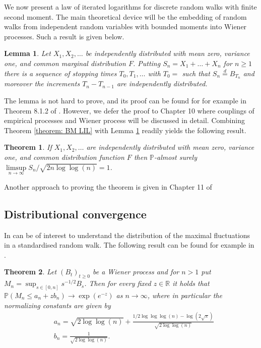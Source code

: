 \documentclass{article}
\newtheorem{theorem}{Theorem}[section]
\newtheorem{lemma}{Lemma}[section]
\begin{document}
We now present a law of iterated logarithms for discrete random walks with finite second moment. The main theoretical device will be the embedding of random walks from independent random variables with bounded moments into Wiener processes. Such a result is given below. 

\begin{lemma}
Let $X_1, X_2, \dots$ be independently distributed with mean zero, variance one, and common marginal distribution $F$. Putting $S_n = X_1 + \dots + X_n$ for $n \geq 1$ there is a sequence of stopping times $T_0, T_1, \dots$ with $T_0 = $ such that $S_n \stackrel{d}{=} B_{T_n}$ and moreover the increments $T_n - T_{n-1}$ are independently distributed. 
\label{lemma: random walk coupling}
\end{lemma}

The lemma is not hard to prove, and its proof can be found for for example in Theorem 8.1.2 of \cite{durrett2019probability}. However, we defer the proof to Chapter 10 where couplings of empirical processes and Wiener process will be discussed in detail. Combining Theorem \ref{theorem: BM LIL} with Lemma \ref{lemma: random walk coupling} readily yields the following result. 

\begin{theorem}
If $X_1, X_2, \dots$ are independently distributed with mean zero, variance one, and common distribution function $F$ then $\mathbb{P}$-almost surely $\limsup \limits_{n \rightarrow \infty} S_n / \sqrt{2 n \log \log (n)} = 1$. 
\label{theorem: LIL random walk}
\end{theorem}

Another approach to proving the theorem is given in Chapter 11 of \cite{pollard2002user}

\subsection{Distributional convergence}

In can be of interest to understand the distribution of the maximal fluctuations in a standardised random walk. The following result can be found for example in \cite{kabluchko2007extreme}. 

\begin{theorem}
Let $\left (B_t \right )_{t \geq 0}$ be a Wiener process and for $n > 1$ put $M_n = \sup_{s \in [0,n]} s^{-1/2} B_s$. Then for every fixed $z \in \mathbb{R}$ it holds that $\mathbb{P} \left ( M_n \leq a_n + z b_n \right ) \rightarrow \exp (e^{-z})$ as $n \rightarrow \infty$, where in particular the normalizing constants are given by
\begin{align}
& a_n = \sqrt{2 \log \log (n)} + \frac{1/2 \log \log \log (n) - \log \left ( 2 \sqrt{\pi} \right )}{\sqrt{2 \log \log (n)}} \\ 
& b_n = \frac{1}{\sqrt{2 \log \log (n)}}.
\end{align}
\label{theorem: distributional LIL for Wiener process}
\end{theorem}
\end{document}
